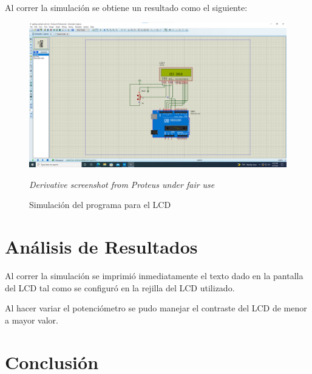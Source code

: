\documentclass{article}
\begin{document}
    \bigbreak

    Al correr la simulación se obtiene un resultado como el siguiente:

    \begin{figure}[H]
        \centering
        \includegraphics[width=0.6\paperwidth]{images/sim-running.png}
        \caption{Simulación del programa para el LCD}\footnotesize
        \textit{Derivative screenshot from Proteus under fair use}
    \end{figure}

    \section{Análisis de Resultados}

    Al correr la simulación se imprimió inmediatamente el texto dado en la pantalla del LCD tal como se configuró en la rejilla del LCD utilizado.

    \bigbreak

    Al hacer variar el potenciómetro se pudo manejar el contraste del LCD de menor a mayor valor.

    \section{Conclusión}



    \printbibliography
\end{document}
